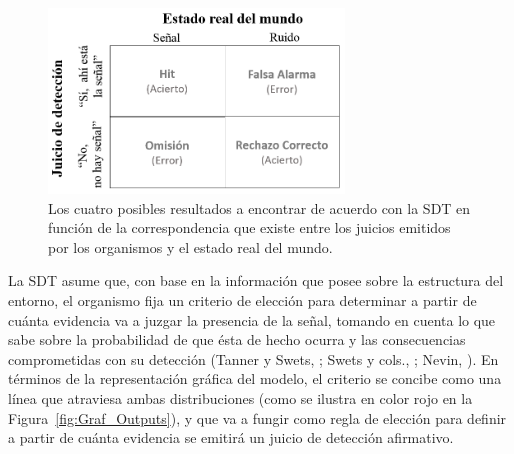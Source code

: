 \begin{figure}[th]
\centering
\includegraphics[width=0.70\textwidth]{Figures/Matriz_Outputs} 
\caption[Matriz de contingencia con los posibles Resultados en una Tarea de Detección]{Los cuatro posibles resultados a encontrar de acuerdo con la SDT en función de la correspondencia que existe entre los juicios emitidos por los organismos y el estado real del mundo.}
\label{fig:Mat_Output}
\end{figure}

La SDT asume que, con base en la información que posee sobre la estructura del entorno, el organismo fija un criterio de elección para determinar a partir de cuánta evidencia va a juzgar la presencia de la señal, tomando en cuenta lo que sabe sobre la probabilidad de que ésta de hecho ocurra y las consecuencias comprometidas con su detección (Tanner y Swets, \citeyear{Tanner1954}; Swets y cols., \citeyear{Swets1961}; Nevin, \citeyear{Nevin1969}). En términos de la representación gráfica del modelo, el criterio se concibe como una línea que atraviesa ambas distribuciones (como se ilustra en color rojo en la Figura~\ref{fig:Graf_Outputs}), y que va a fungir como regla de elección para definir a partir de cuánta evidencia se emitirá un juicio de detección afirmativo.\\


